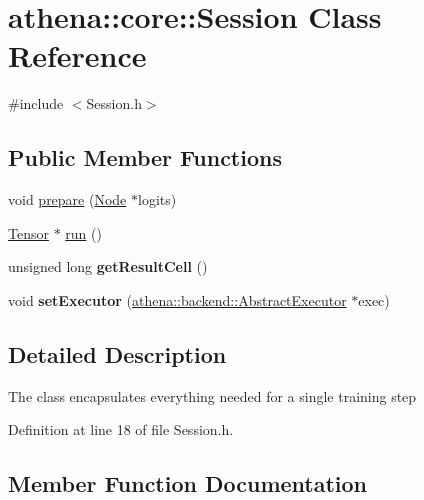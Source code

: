 \hypertarget{classathena_1_1core_1_1_session}{}\section{athena\+:\+:core\+:\+:Session Class Reference}
\label{classathena_1_1core_1_1_session}


{\ttfamily \#include $<$Session.\+h$>$}

\subsection*{Public Member Functions}
\begin{DoxyCompactItemize}
\item 
void \mbox{\hyperlink{classathena_1_1core_1_1_session_a28b51416420aca2c39d9cf7ee81fe41d}{prepare}} (\mbox{\hyperlink{classathena_1_1core_1_1_node}{Node}} $\ast$logits)
\item 
\mbox{\hyperlink{classathena_1_1core_1_1_tensor}{Tensor}} $\ast$ \mbox{\hyperlink{classathena_1_1core_1_1_session_ab08af50ae0bbd2ed5171e1f45a7680ff}{run}} ()
\item 
\mbox{\label{classathena_1_1core_1_1_session_a560fda7749519c69a5cafd889fd4077c}} 
unsigned long {\bfseries get\+Result\+Cell} ()
\item 
\mbox{\label{classathena_1_1core_1_1_session_a8aaab4641be2fe06e2ae098c366375e8}} 
void {\bfseries set\+Executor} (\mbox{\hyperlink{classathena_1_1backend_1_1_abstract_executor}{athena\+::backend\+::\+Abstract\+Executor}} $\ast$exec)
\end{DoxyCompactItemize}


\subsection{Detailed Description}
The class encapsulates everything needed for a single training step 

Definition at line 18 of file Session.\+h.



\subsection{Member Function Documentation}
\mbox{\label{classathena_1_1core_1_1_session_a28b51416420aca2c39d9cf7ee81fe41d}} 
